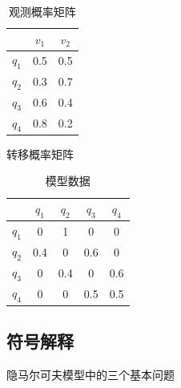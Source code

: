\documentclass[a4paper,12pt]{ctexart}     %
\begin{document}
\begin{table}[htbp]\songti{} 
	
	\begin{center}
		\renewcommand\arraystretch{2}         %
		\caption{观测概率矩阵 \label{tab:shuoming}} 
		{
			
			\begin{tabular}{|c|c|c|}\hline   %
				
				\small &$ v_1 $&$ v_2$\\\hline   %
				$ q_1 $&0.5&0.5\\\hline
				$ q_2 $&0.3&0.7\\\hline
				$ q_3 $&0.6&0.4\\\hline
				$ q_4 $&0.8&0.2\\\hline
			\end{tabular}
		}
	\end{center}
\end{table}
	转移概率矩阵
	\begin{table}[htbp]\songti{} 
		\begin{center}
			\renewcommand\arraystretch{2}         %
			\caption{模型数据 \label{tab:hezi}} 
			{  %
				
				\begin{tabular}{|c|c|c|c|c|}\hline   %
					
					\small &$ q_1 $ &$ q_2 $&$ q_3 $&$ q_4 $\\\hline   %
					$ q_1 $&0&1&0&0\\\hline
					$ q_2 $&0.4&0&0.6&0\\\hline
					$ q_3 $&0&0.4&0&0.6\\\hline
					$ q_4 $&0&0&0.5&0.5\\\hline
				\end{tabular}
			}
		\end{center}
	\end{table}
	
	\subsection{符号解释}
	隐马尔可夫模型中的三个基本问题
	
\end{document}
